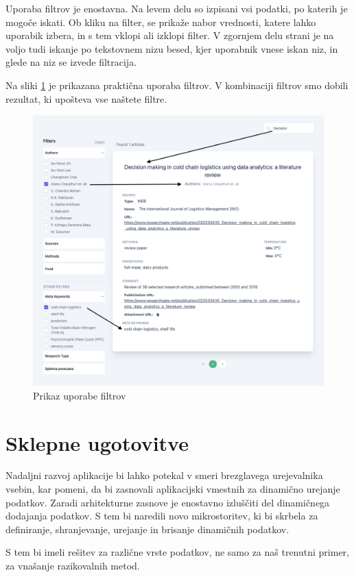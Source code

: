 \documentclass[a4paper, 12pt]{book}
\begin{document}
Uporaba filtrov je enostavna. Na levem delu so izpisani vsi podatki, po katerih je mogoče iskati. Ob kliku na filter, se prikaže nabor vrednosti, katere lahko uporabik izbera, in s tem vklopi ali izklopi filter. V zgornjem delu strani je na voljo tudi iskanje po tekstovnem nizu besed, kjer uporabnik vnese iskan niz, in glede na niz se izvede filtracija. 


Na sliki \ref{seach example} je prikazana praktična uporaba filtrov. V kombinaciji filtrov smo dobili rezultat, ki upošteva vse naštete filtre. 

\begin{figure}[h]
\begin{center}
\includegraphics[width=1\textwidth]{slike/search.png}
\end{center}
\caption{ Prikaz uporabe filtrov }
\label{seach example}
\end{figure}




\chapter{Sklepne ugotovitve}
Nadaljni razvoj aplikacije bi lahko potekal v smeri brezglavega urejevalnika vsebin, kar pomeni, da bi zasnovali aplikacijski vmestnih za dinamično urejanje podatkov. Zaradi arhitekturne zasnove je enostavno izluščiti del dinamičnega dodajanja podatkov. S tem bi naredili novo mikrostoritev, ki bi skrbela za definiranje, shranjevanje, urejanje in brisanje dinamičnih podatkov. 

S tem bi imeli rešitev za različne vrste podatkov, ne samo za naš trenutni primer, za vnašanje razikovalnih metod. 


\clearpage
{}


\end{document}
